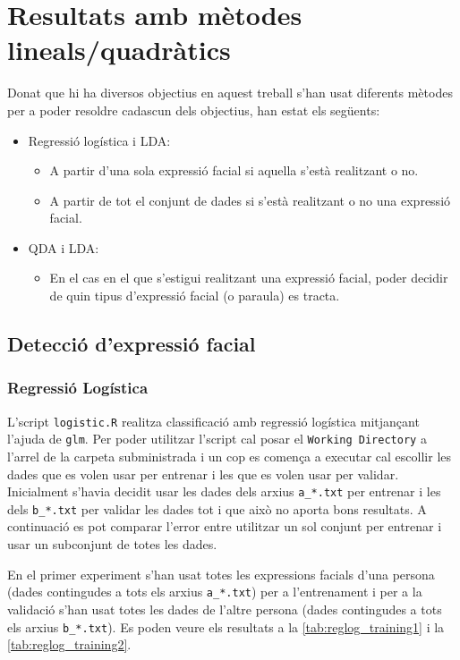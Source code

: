 \documentclass[a4paper]{article}
\begin{document}
\section{Resultats amb mètodes lineals/quadràtics}
Donat que hi ha diversos objectius en aquest treball s'han usat diferents mètodes per a poder resoldre cadascun dels objectius, han estat els següents:
\begin{itemize}
	\item Regressió logística i LDA:
	\begin{itemize}
		\item A partir d'una sola expressió facial si aquella s'està realitzant o no.
		\item A partir de tot el conjunt de dades si s'està realitzant o no una expressió facial.
	\end{itemize}
	\item QDA i LDA:
	\begin{itemize}
		\item En el cas en el que s'estigui realitzant una expressió facial, poder decidir de quin tipus d'expressió facial (o paraula) es tracta.
	\end{itemize}
\end{itemize}

\subsection{Detecció d'expressió facial}
\subsubsection{Regressió Logística}
L'script \verb|logistic.R| realitza classificació amb regressió logística mitjançant l'ajuda de \verb|glm|. Per poder utilitzar l'script cal posar el \verb|Working Directory| a l'arrel de la carpeta subministrada i un cop es comença a executar cal escollir les dades que es volen usar per entrenar i les que es volen usar per validar. Inicialment s'havia decidit usar les dades dels arxius \verb|a_*.txt| per entrenar i les dels \verb|b_*.txt| per validar les dades tot i que això no aporta bons resultats. A continuació es pot comparar l'error entre utilitzar un sol conjunt per entrenar i usar un subconjunt de totes les dades.

En el primer experiment s'han usat totes les expressions facials d'una persona (dades contingudes a tots els arxius \verb|a_*.txt|) per a l'entrenament i per a la validació s'han usat totes les dades de l'altre persona (dades contingudes a tots els arxius \verb|b_*.txt|). Es poden veure els resultats a la \autoref{tab:reglog_training1} i la \autoref{tab:reglog_training2}.
\end{document}
